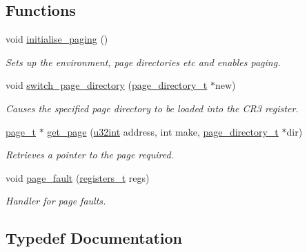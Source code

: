 \subsection*{Functions}
\begin{DoxyCompactItemize}
\item 
void \hyperlink{a00116_ad05c453b13c69ecf5c7963798704cc18_ad05c453b13c69ecf5c7963798704cc18}{initialise\+\_\+paging} ()
\begin{DoxyCompactList}\small\item\em Sets up the environment, page directories etc and enables paging. \end{DoxyCompactList}\item 
void \hyperlink{a00116_af364044d82ac10c64dc653f8e3620dba_af364044d82ac10c64dc653f8e3620dba}{switch\+\_\+page\+\_\+directory} (\hyperlink{a00116_aa6e79064ffe1eb8c43be4dc1be3f64a1_aa6e79064ffe1eb8c43be4dc1be3f64a1}{page\+\_\+directory\+\_\+t} $\ast$new)
\begin{DoxyCompactList}\small\item\em Causes the specified page directory to be loaded into the C\+R3 register. \end{DoxyCompactList}\item 
\hyperlink{a00116_a76113662e059e0926a92c5b15c098f4a_a76113662e059e0926a92c5b15c098f4a}{page\+\_\+t} $\ast$ \hyperlink{a00116_ab80db06fa94f1003fd5a5ec106bc9f6e_ab80db06fa94f1003fd5a5ec106bc9f6e}{get\+\_\+page} (\hyperlink{a00134_a7ae3a26c17ddfe117c6291739780801d_a7ae3a26c17ddfe117c6291739780801d}{u32int} address, int make, \hyperlink{a00116_aa6e79064ffe1eb8c43be4dc1be3f64a1_aa6e79064ffe1eb8c43be4dc1be3f64a1}{page\+\_\+directory\+\_\+t} $\ast$dir)
\begin{DoxyCompactList}\small\item\em Retrieves a pointer to the page required. \end{DoxyCompactList}\item 
void \hyperlink{a00116_a6293af8e675059a566216be86660854b_a6293af8e675059a566216be86660854b}{page\+\_\+fault} (\hyperlink{a00134_adf58dbaf6139b4957c348711f2026957_adf58dbaf6139b4957c348711f2026957}{registers\+\_\+t} regs)
\begin{DoxyCompactList}\small\item\em Handler for page faults. \end{DoxyCompactList}\end{DoxyCompactItemize}


\subsection{Typedef Documentation}
\mbox{\label{a00116_aa6e79064ffe1eb8c43be4dc1be3f64a1_aa6e79064ffe1eb8c43be4dc1be3f64a1}} 

